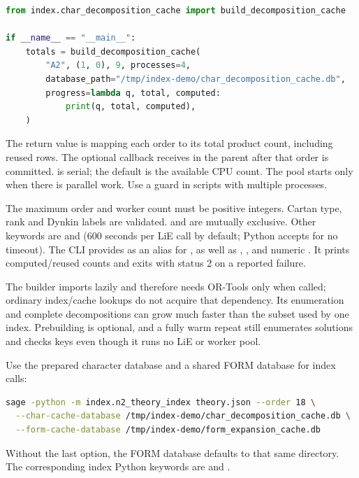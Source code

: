 \begin{lstlisting}[language=Python]
from index.char_decomposition_cache import build_decomposition_cache

if __name__ == "__main__":
    totals = build_decomposition_cache(
        "A2", (1, 0), 9, processes=4,
        database_path="/tmp/index-demo/char_decomposition_cache.db",
        progress=lambda q, total, computed:
            print(q, total, computed),
    )
\end{lstlisting}
The return value is  mapping each order to its total product count, including reused
rows. The optional callback receives  in the
parent after that order is committed.  is serial; the default
is the available CPU count. The pool starts only when there is parallel work.
Use a  guard in scripts with multiple processes.

The maximum order and worker count must be positive integers. Cartan type,
rank and Dynkin labels are validated.  and
 are mutually exclusive. Other keywords are
 and  (600 seconds per LiE call by default;
Python accepts  for no timeout). The CLI provides
 as an alias for , as well as
, , and numeric .
It prints computed/reused counts and exits with status 2 on a reported failure.

The builder imports  lazily and therefore needs OR-Tools
only when called; ordinary index/cache lookups do not acquire that dependency.
Its enumeration and complete decompositions can grow much faster than the subset
used by one index. Prebuilding is optional, and a fully warm repeat still
enumerates solutions and checks keys even though it runs no LiE or worker pool.

Use the prepared character database and a shared FORM database for index calls:
\begin{lstlisting}[language=bash]
sage -python -m index.n2_theory_index theory.json --order 18 \
  --char-cache-database /tmp/index-demo/char_decomposition_cache.db \
  --form-cache-database /tmp/index-demo/form_expansion_cache.db
\end{lstlisting}
Without the last option, the FORM database defaults to that same directory.
The corresponding index Python keywords are 
and \code{form_cache_database_path=}.
